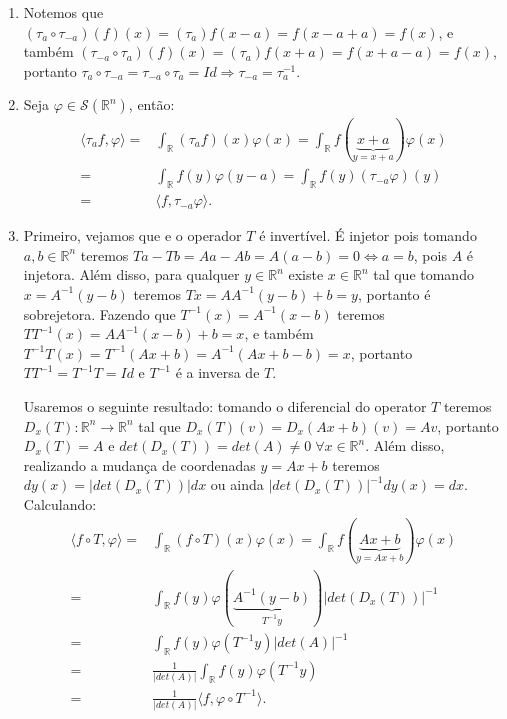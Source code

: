 \documentclass{article}
\begin{document}
\begin{enumerate}
\begin{enumerate}
				\item Notemos que $(\tau_{a} \circ \tau_{-a})(f)(x) = (\tau_{a})f(x-a) = f(x- a+a) = f(x)$, e também $(\tau_{-a} \circ \tau_{a})(f)(x) = (\tau_{a})f(x+a) = f(x+a-a) = f(x)$, portanto $\tau_{a} \circ \tau_{-a} = \tau_{-a} \circ \tau_{a} = Id \Rightarrow \tau_{-a} = \tau^{-1}_{a}$.
				
				\item Seja $\varphi \in \mathcal{S}(\mathbb{R}^{n})$, então:
				$$
				\begin{aligned}
				\langle \tau_{a}f, \varphi \rangle = & \int_{\mathbb{R}} (\tau_{a}f)(x)\varphi(x)
				= \int_{\mathbb{R}} f(\underbrace{ x+a }_{y = x+a}) \varphi(x)
				\\
				= & \int_{\mathbb{R}} f(y)\varphi(y-a)
				=  \int_{\mathbb{R}} f(y) (\tau_{-a}\varphi)(y) 
				\\
				= & \langle f, \tau_{-a}\varphi \rangle.
				\end{aligned}
				$$
				
				\item Primeiro, vejamos que e o operador $T$ é invertível. É injetor pois tomando $a, b \in \mathbb{R}^{n}$ teremos $Ta- Tb = Aa - Ab = A(a-b) = 0 \iff a=b$, pois $A$ é injetora. Além disso, para qualquer $y \in \mathbb{R}^{n}$ existe $x \in \mathbb{R}^{n}$ tal que tomando $x = A^{-1}(y -b)$ teremos $Tx = AA^{-1}(y -b) + b = y$, portanto é sobrejetora. Fazendo que $T^{-1}(x) = A^{-1}(x - b)$ teremos $TT^{-1}(x) = AA^{-1}(x - b) + b = x$, e também $T^{-1}T(x) = T^{-1}(Ax + b) = A^{-1}(Ax+b - b) = x$, portanto $TT^{-1} = T^{-1}T = Id$ e $T^{-1}$ é a inversa de $T$.
				
				Usaremos o seguinte resultado: tomando o diferencial do operator $T$ teremos $D_{x}(T): \mathbb{R}^{n} \to \mathbb{R}^{n}$ tal que $D_{x}(T)(v) = D_{x}(Ax+b)(v) = Av$, portanto $D_{x}(T) = A$ e $det(D_{x}(T)) = det(A) \neq 0 \; \forall x \in \mathbb{R}^{n}$. Além disso, realizando a mudança de coordenadas $y = Ax+b$ teremos $dy(x) = |det(D_{x}(T))|dx$ ou ainda $|det(D_{x}(T))|^{-1} dy(x) = dx$. Calculando:
				$$
				\begin{aligned}
				\langle f \circ T, \varphi \rangle = & \int_{\mathbb{R}} (f \circ T)(x)\varphi(x)
				= \int_{\mathbb{R}} f(\underbrace{ Ax+b }_{y = Ax+b})\varphi(x)
				\\
				= & \int_{\mathbb{R}} f(y)\varphi(\underbrace{ A^{-1}(y - b)}_{T^{-1}y} ) \Big| det(D_{x}(T)) \Big|^{-1}
				\\
				= & \int_{\mathbb{R}} f(y)\varphi(T^{-1}y)  |det(A)|^{-1}
				\\
				= & \frac{1}{|det(A)|} \int_{\mathbb{R}} f(y)\varphi(T^{-1}y)
				\\
				= & \frac{1}{|det(A)|} \langle f, \varphi \circ T^{-1}\rangle.
				\end{aligned}
				$$
				

\end{enumerate}
\end{enumerate}
\end{document}
